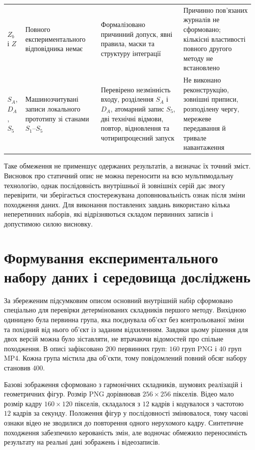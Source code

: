 \begin{longtable}{@{}>{\raggedright\arraybackslash}p{}>{\raggedright\arraybackslash}p{}>{\raggedright\arraybackslash}p{}>{\raggedright\arraybackslash}p{}@{}}
$Z_b$ і $Z$ & Повного експериментального відповідника немає & Формалізовано причинний допуск, явні правила, маски та структуру інтеграції & Причинно пов’язаних журналів не сформовано; кількісні властивості повного другого методу не встановлено \\
$S_A$, $D_A$, $S_5$ & Машинозчитувані записи локального прототипу зі станами $S_1$--$S_5$ & Перевірено незмінність входу, розділення $S_A$ і $D_A$, атомарний запис $S_5$, дві технічні відмови, повтор, відновлення та чотирипроцесний запуск & Не виконано реконструкцію, зовнішні приписи, розподілену чергу, мережеве передавання й тривале навантаження \\
\end{longtable}
\endgroup

Таке обмеження не применшує одержаних результатів, а визначає їх точний зміст. Висновок про статичний опис не можна переносити на всю мультимодальну технологію, однак послідовність внутрішньої й зовнішніх серій дає змогу перевірити, чи зберігається спостережувана доповнювальність ознак після зміни походження даних. Для виконання поставлених завдань використано кілька неперетинних наборів, які відрізняються складом первинних записів і допустимою силою висновку.

\section{Формування експериментального набору даних і середовища досліджень}

За збереженим підсумковим описом основний внутрішній набір сформовано спеціально для перевірки детермінованих складників першого методу. Вихідною одиницею була первинна група, яка поєднувала об’єкт без контрольованої зміни та похідний від нього об’єкт із заданим відхиленням. Завдяки цьому рішення для двох версій можна було зіставляти, не втрачаючи відомостей про спільне походження. В описі зафіксовано $200$ первинних груп: $160$ груп PNG і $40$ груп MP4. Кожна група містила два об’єкти, тому повідомлений повний обсяг набору становив $400$.

Базові зображення сформовано з гармонічних складників, шумових реалізацій і геометричних фігур. Розмір PNG дорівнював $256\times256$ пікселів. Відео мало розмір кадру $160\times120$ пікселів, складалося з $12$ кадрів і кодувалося з частотою $12$ кадрів за секунду. Положення фігур у послідовності змінювалося, тому часові ознаки відео не зводилися до повторення одного нерухомого кадру. Синтетичне походження забезпечило керованість змін, але водночас обмежило переносимість результату на реальні дані зображень і відеозаписів.

